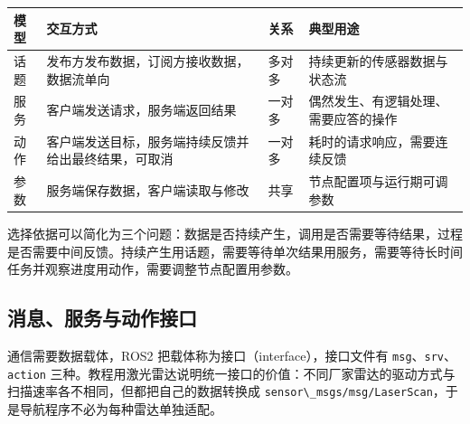 \begin{longtable}[]{@{}
  >{\raggedright\arraybackslash}p{}
  >{\raggedright\arraybackslash}p{}
  >{\raggedright\arraybackslash}p{}
  >{\raggedright\arraybackslash}p{}@{}}
\toprule\noalign{}
\begin{minipage}[b]{\linewidth}\raggedright
模型
\end{minipage} & \begin{minipage}[b]{\linewidth}\raggedright
交互方式
\end{minipage} & \begin{minipage}[b]{\linewidth}\raggedright
关系
\end{minipage} & \begin{minipage}[b]{\linewidth}\raggedright
典型用途
\end{minipage} \\
\midrule\noalign{}
\endhead
\bottomrule\noalign{}
\endlastfoot
话题 & 发布方发布数据，订阅方接收数据，数据流单向 & 多对多 &
持续更新的传感器数据与状态流 \\
服务 & 客户端发送请求，服务端返回结果 & 一对多 &
偶然发生、有逻辑处理、需要应答的操作 \\
动作 & 客户端发送目标，服务端持续反馈并给出最终结果，可取消 & 一对多 &
耗时的请求响应，需要连续反馈 \\
参数 & 服务端保存数据，客户端读取与修改 & 共享 &
节点配置项与运行期可调参数 \\
\end{longtable}

选择依据可以简化为三个问题：数据是否持续产生，调用是否需要等待结果，过程是否需要中间反馈。持续产生用话题，需要等待单次结果用服务，需要等待长时间任务并观察进度用动作，需要调整节点配置用参数。

\subsection{消息、服务与动作接口}\label{ux6d88ux606fux670dux52a1ux4e0eux52a8ux4f5cux63a5ux53e3}

通信需要数据载体，ROS2 把载体称为接口（interface），接口文件有
\passthrough{\lstinline!msg!}、\passthrough{\lstinline!srv!}、\passthrough{\lstinline!action!}
三种。教程用激光雷达说明统一接口的价值：不同厂家雷达的驱动方式与扫描速率各不相同，但都把自己的数据转换成
\passthrough{\lstinline!sensor\_msgs/msg/LaserScan!}，于是导航程序不必为每种雷达单独适配。


